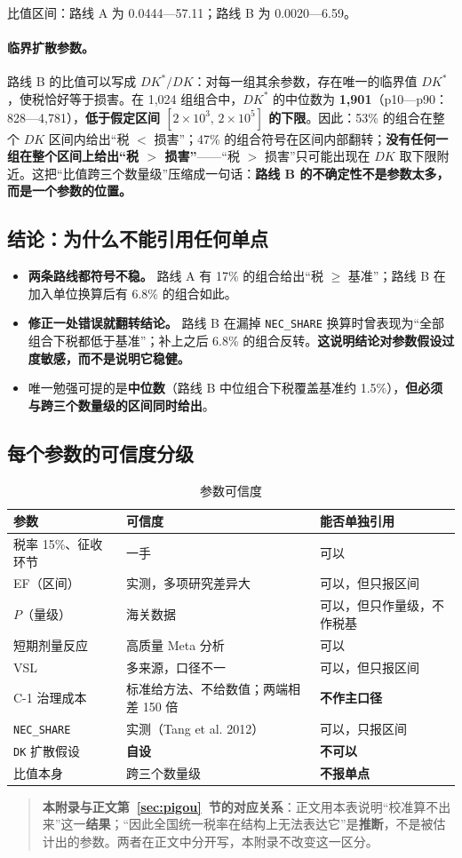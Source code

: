 比值区间：路线 A 为 0.0444—57.11；路线 B 为 0.0020—6.59。

\paragraph{临界扩散参数。} 路线 B 的比值可以写成 $DK^*/DK$：对每一组其余参数，存在唯一的临界值 $DK^*$，使税恰好等于损害。在 1{,}024 组组合中，$DK^*$ 的中位数为 \textbf{1{,}901}（p10—p90：828—4{,}781），\textbf{低于假定区间 $[2\times10^3,\,2\times10^5]$ 的下限}。因此：53\% 的组合在整个 $DK$ 区间内给出“税 $<$ 损害”；47\% 的组合符号在区间内部翻转；\textbf{没有任何一组在整个区间上给出“税 $>$ 损害”}——“税 $>$ 损害”只可能出现在 $DK$ 取下限附近。这把“比值跨三个数量级”压缩成一句话：\textbf{路线 B 的不确定性不是参数太多，而是一个参数的位置。}

\subsection{结论：为什么不能引用任何单点}

\begin{itemize}
  \item \textbf{两条路线都符号不稳。} 路线 A 有 17\% 的组合给出“税 $\geq$ 基准”；路线 B 在加入单位换算后有 6.8\% 的组合如此。
  \item \textbf{修正一处错误就翻转结论。} 路线 B 在漏掉 \texttt{NEC\_SHARE} 换算时曾表现为“全部组合下税都低于基准”；补上之后 6.8\% 的组合反转。\textbf{这说明结论对参数假设过度敏感，而不是说明它稳健。}
  \item 唯一勉强可提的是\textbf{中位数}（路线 B 中位组合下税覆盖基准约 1.5\%），\textbf{但必须与跨三个数量级的区间同时给出}。
\end{itemize}

\subsection{每个参数的可信度分级}

\begin{table}[H]
\centering
\caption{参数可信度}
\label{tab:credibility}
\small
\begin{tabular}{L{4.2cm}L{6.6cm}L{3.4cm}}
\toprule
\textbf{参数} & \textbf{可信度} & \textbf{能否单独引用} \\
\midrule
税率 15\%、征收环节 & 一手 & 可以 \\
EF（区间） & 实测，多项研究差异大 & 可以，但只报区间 \\
$P$（量级） & 海关数据 & 可以，但只作量级，不作税基 \\
短期剂量反应 & 高质量 Meta 分析 & 可以 \\
VSL & 多来源，口径不一 & 可以，但只报区间 \\
C-1 治理成本 & 标准给方法、不给数值；两端相差 150 倍 & \textbf{不作主口径} \\
\texttt{NEC\_SHARE} & 实测（Tang et al. 2012） & 可以，只报区间 \\
\texttt{DK} 扩散假设 & \textbf{自设} & \textbf{不可以} \\
比值本身 & 跨三个数量级 & \textbf{不报单点} \\
\bottomrule
\end{tabular}
\end{table}

\begin{quote}
\textbf{本附录与正文第~\ref{sec:pigou}~节的对应关系}：正文用本表说明“校准算不出来”这一\textbf{结果}；“因此全国统一税率在结构上无法表达它”是\textbf{推断}，不是被估计出的参数。两者在正文中分开写，本附录不改变这一区分。
\end{quote}
